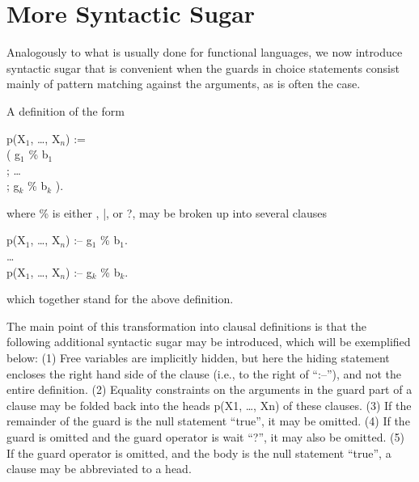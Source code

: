 \section{More Syntactic Sugar}

Analogously to what is usually done for functional languages, we now
introduce syntactic sugar that is convenient when the guards in choice
statements consist mainly of pattern matching against the arguments,
as is often the case.

A definition of the form
%
\begin{program}
p(X$_1$, \dots, X$_n$) := \\
\>\>( g$_1$ \% b$_1$ \\
\>\>; \dots \\
\>\>; g$_k$ \% b$_k$ ).
\end{program}%
%
where {\prog \%} is either {\prog \cond}, {\prog |}, or {\prog ?}, may
be broken up into several clauses
%
\begin{program}
p(X$_1$, \dots, X$_n$) :-- g$_1$ \% b$_1$.  \\
\dots \\
p(X$_1$, \dots, X$_n$) :-- g$_k$ \% b$_k$.
\end{program}%
%
which together stand for the above definition.

The main point of this transformation into clausal definitions is that
the following additional syntactic sugar may be introduced, which will
be exemplified below: (1) Free variables are implicitly hidden, but
here the hiding statement encloses the right hand side of the clause
(i.e., to the right of ``{\prog :--}''), and not the entire
definition.  (2) Equality constraints on the arguments in the guard
part of a clause may be folded back into the heads {\prog p(X1, \dots,
Xn)} of these clauses.  (3) If the remainder of the guard is the null
statement ``{\prog true}'', it may be omitted.  (4) If the guard is
omitted and the guard operator is wait ``{\prog ?}'', it may also be
omitted.  (5) If the guard operator is omitted, and the body is the
null statement ``{\prog true}'', a clause may be abbreviated to a
head.

